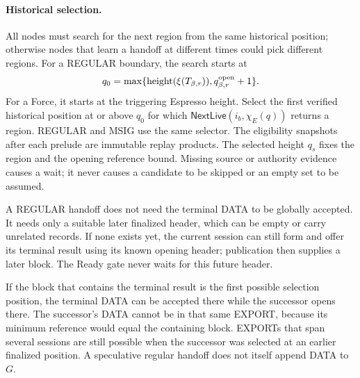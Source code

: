\documentclass[11pt,a4paper]{article}
\newcommand{\tagg}[1]{\ensuremath{\mathsf{#1}}}
\begin{document}
\paragraph{Historical selection.}
All nodes must search for the next region from the same historical
position; otherwise nodes that learn a handoff at different times could
pick different regions. For a REGULAR boundary, the search starts at
\[
 q_0=\max\{\operatorname{height}(\xi(T_{\beta,r})),
                         q^{\rm open}_{\beta,r}+1\}.
\]
For a Force, it starts at the triggering Espresso height. Select the
first verified historical position at or above $q_0$ for which
$\tagg{NextLive}(i_b,\chi_E(q))$ returns a region. REGULAR and MSIG use
the same selector. The eligibility snapshots after each prelude are
immutable replay products. The selected height $q_s$ fixes the region and
the opening reference bound. Missing source or authority evidence causes
a wait; it never causes a candidate to be skipped or an empty set to be
assumed.

A REGULAR handoff does not need the terminal DATA to be globally
accepted. It needs only a suitable later finalized header, which can be
empty or carry unrelated records. If none exists yet, the current session
can still form and offer its terminal result using its known opening
header; publication then supplies a later block. The Ready gate never
waits for this future header.

If the block that contains the terminal result is the first possible
selection position, the terminal DATA can be accepted there while the
successor opens there. The successor's DATA cannot be in that same
EXPORT, because its minimum reference would equal the containing block.
EXPORTs that span several sessions are still possible when the successor
was selected at an earlier finalized position. A speculative regular
handoff does not itself append DATA to $G$.
\end{document}
